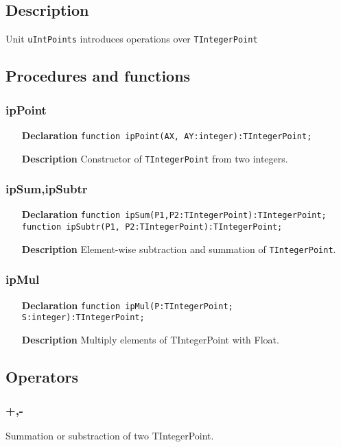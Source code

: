 \documentclass[12pt,a4paper,oneside]{report}
\newcommand{\declarationitem}[1]{\textbf{#1}}
\newcommand{\descriptiontitle}[1]{\textbf{#1}}
\newcommand{\code}[1]{\texttt{#1}}
\begin{document}
\subsection{Description}
Unit \code{uIntPoints} introduces operations over \code{TIntegerPoint}
\subsection{Procedures and functions}
\subsubsection{ipPoint}
\label{ipPoint}
\begin{itemize}
	\item[\declarationitem{Declaration}\hfill]
	\code{function ipPoint(AX, AY:integer):TIntegerPoint;}
	\item[\descriptiontitle{Description}]Constructor of \code{TIntegerPoint} from two integers.
\end{itemize}
\subsubsection{ipSum,ipSubtr}
\label{ipSubtr}
\begin{itemize}
	\item[\declarationitem{Declaration}\hfill]
	\code{function ipSum(P1,P2:TIntegerPoint):TIntegerPoint;\\
		function ipSubtr(P1, P2:TIntegerPoint):TIntegerPoint;}
	\item[\descriptiontitle{Description}]Element-wise subtraction and summation of \code{TIntegerPoint}.
\end{itemize}
\subsubsection{ipMul}
\label{ipMul}
\begin{itemize}
	\item[\declarationitem{Declaration}\hfill]
	\code{function ipMul(P:TIntegerPoint; S:integer):TIntegerPoint;}
	\item[\descriptiontitle{Description}]Multiply elements of TIntegerPoint with Float.
\end{itemize}
\subsection{Operators}
\subsubsection{+,-}
Summation or substraction of two TIntegerPoint.
\end{document}
